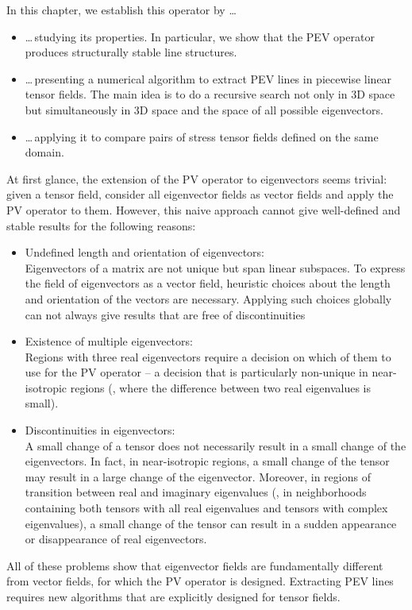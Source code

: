 %
In this chapter, we establish this operator by \ldots
%
\begin{itemize}
    \item
    \ldots{}\,studying its properties.
    In particular, we show that the \ac{PEV} operator produces structurally
    stable line structures.
    \item
    \ldots{}\,presenting a numerical algorithm to extract \ac{PEV} lines in
    piecewise linear tensor fields.
    The main idea is to do a recursive search not only in \ac{3D} space but
    simultaneously in \ac{3D} space and the space of all possible eigenvectors.
    \item
    \ldots{}\,applying it to compare pairs of stress tensor fields defined on
    the same domain.
\end{itemize}
%
At first glance, the extension of the \ac{PV} operator to eigenvectors seems
trivial:
%
given a tensor field, consider all eigenvector fields as vector fields and apply
the \ac{PV} operator to them.
%
However, this naive approach cannot give well-defined and stable results for
the following reasons:
%
\begin{itemize}
    \item Undefined length and orientation of eigenvectors:\\
    Eigenvectors of a matrix are not unique but span linear subspaces.
    To express the field of eigenvectors as a vector field, heuristic
    choices about the length and orientation of the vectors are necessary.
    Applying such choices globally can not always give results that are free of
    discontinuities
    \item Existence of multiple eigenvectors:\\
    Regions with three real eigenvectors require a decision on which of them to
    use for the \ac{PV} operator -- a decision that is particularly non-unique
    in near-isotropic regions
    (\ie, where the difference between two real eigenvalues is small).
    \item Discontinuities in eigenvectors:\\
    A small change of a tensor does not necessarily result in a small change of
    the eigenvectors.
    In fact, in near-isotropic regions, a small change of the tensor may result
    in a large change of the eigenvector.
    Moreover, in regions of transition between real and imaginary eigenvalues
    (\ie, in neighborhoods containing both tensors with all real eigenvalues and
    tensors with complex eigenvalues), a small change of the tensor can result
    in a sudden appearance or disappearance of real eigenvectors.
\end{itemize}
%
All of these problems show that eigenvector fields are fundamentally different
from vector fields, for which the \ac{PV} operator is designed.
%
Extracting \ac{PEV} lines requires new algorithms that are explicitly designed
for tensor fields.
%

